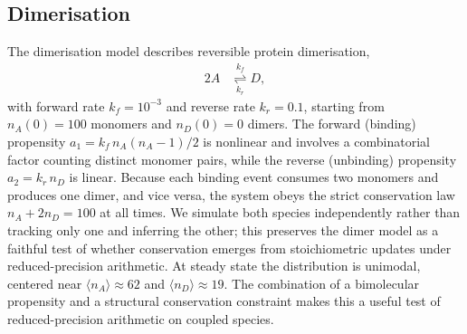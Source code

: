 \documentclass{article}
\begin{document}
\subsection{Dimerisation}

The dimerisation model \cite{gillespie2007} describes reversible protein dimerisation,
\begin{align*}
    2A &\underset{k_r}{\overset{k_f}{\rightleftharpoons}} D,
\end{align*}
with forward rate $k_f = 10^{-3}$ and reverse rate $k_r = 0.1$, starting from $n_A(0) = 100$ monomers and $n_D(0) = 0$ dimers. The forward (binding) propensity $a_1 = k_f \, n_A(n_A - 1)/2$ is nonlinear and involves a combinatorial factor counting distinct monomer pairs, while the reverse (unbinding) propensity $a_2 = k_r \, n_D$ is linear. Because each binding event consumes two monomers and produces one dimer, and vice versa, the system obeys the strict conservation law $n_A + 2n_D = 100$ at all times. We simulate both species independently rather than tracking only one and inferring the other; this preserves the dimer model as a faithful test of whether conservation emerges from stoichiometric updates under reduced-precision arithmetic. At steady state the distribution is unimodal, centered near $\langle n_A \rangle \approx 62$ and $\langle n_D \rangle \approx 19$. The combination of a bimolecular propensity and a structural conservation constraint makes this a useful test of reduced-precision arithmetic on coupled species.
\end{document}
